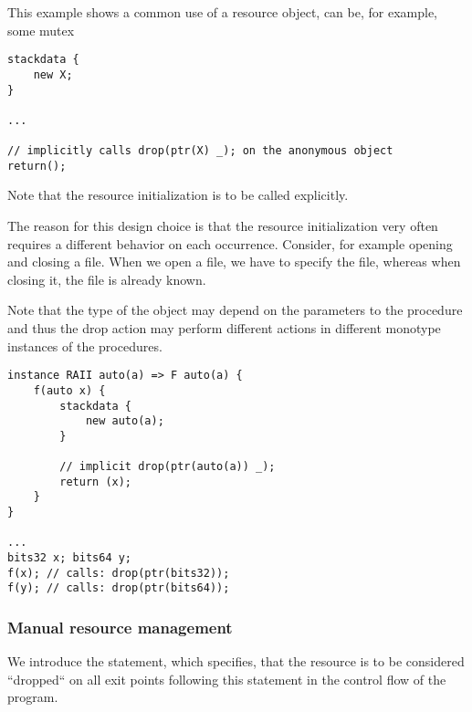 \begin{ex}
    This example shows a common use of a resource object,  can be, for example, some mutex
    \begin{lstlisting}
stackdata {
    new X;
}

...

// implicitly calls drop(ptr(X) _); on the anonymous object
return();
    \end{lstlisting}
\end{ex}

\begin{remark}
    Note that the resource initialization is to be called explicitly.

    The reason for this design choice is that the resource initialization very often requires a different behavior on each occurrence. Consider, for example opening and closing a file. When we open a file, we have to specify the file, whereas when closing it, the file is already known.
\end{remark}

\begin{remark}
    Note that the type of the object may depend on the parameters to the procedure and thus the drop action may perform different actions in different monotype instances of the procedures.
\end{remark}

\begin{ex}
    \begin{lstlisting}
instance RAII auto(a) => F auto(a) {
    f(auto x) {
        stackdata {
            new auto(a);
        }

        // implicit drop(ptr(auto(a)) _);
        return (x);
    }
}

...
bits32 x; bits64 y;
f(x); // calls: drop(ptr(bits32));
f(y); // calls: drop(ptr(bits64));
    \end{lstlisting}
\end{ex}

\subsubsection{Manual resource management}

We introduce the  statement, which specifies, that the resource is to be considered ``dropped`` on all exit points following this statement in the control flow of the program.

